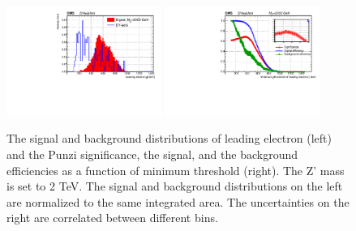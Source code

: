 \begin{figure}[htbp]
   \centering
   \includegraphics[width=0.45\textwidth]{optimization/plot_1st_pt/plot_1st_pt_input_in_Zprime_mass_2000.pdf}
   \includegraphics[width=0.45\textwidth]{optimization/plot_1st_pt/plot_1st_pt_Significance_and_efficiency_for_Zprme_M_2000.pdf}
   \caption{The signal and background distributions of leading electron \pt 
(left) and the Punzi significance, the signal, and the background efficiencies as a 
 function of minimum \pt threshold (right). The Z' mass is set to 2 TeV. The 
   signal and background distributions on the left are normalized to the same 
   integrated area. The uncertainties on the right are correlated between 
 different bins.}
   \label{fig:leadpttwo}
\end{figure}

